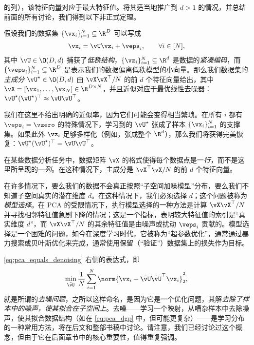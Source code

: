 \documentclass[../../book-main_zh.tex]{subfiles}
\begin{document}
的列），该特征向量对应于最大特征值。将其适当地推广到 \(d > 1\) 的情况，并总结前面的所有讨论，我们得到以下非正式定理。
\begin{theorem}\label{thm:pca}
    假设我们的数据集 \(\{\vx_{i}\}_{i = 1}^{N} \subseteq
    \R^{D}\) 可以写成
    \begin{equation}
        \vx_{i} = \vU\vz_{i} + \veps_{i}, \qquad \forall i \in [N],
    \end{equation}
    其中 \(\vU \in \O(D, d)\) 捕获了\textit{低秩结构}，\(\{\vz_{i}\}_{i =
    1}^{N} \subseteq \R^{d}\) 是数据的\textit{紧凑编码}，而 \(\{\veps_{i}\}_{i
    = 1}^{N} \subseteq \R^{D}\)
    是表示我们的数据偏离低秩模型的小向量。那么我们数据集的\textit{主成分} \(\vU^{\star} \in \O(D,
    d)\) 由 \(\vX\vX^{\top}/N\) 的前 \(d\) 个特征向量给出，其中 \(\vX = [\vx_{1},
        \dots, \vx_{N}] \in \R^{D \times
    N}\)，并且近似对应于最优线性去噪器：\(\vU^{\star}(\vU^{\star})^{\top} \approx
    \vU\vU^{\top}\)。
\end{theorem}
我们在这里不给出明确的近似率，因为它们可能会变得相当繁琐。在所有 \(i\) 都有 \(\veps_{i} = \vzero\)
的特殊情况下，学习到的 \(\vU^{\star}\) 张成了样本 \(\{\vx_{i}\}_{i
= 1}^{N}\) 的支撑集。如果此外 \(\vz_{i}\) 足够多样化（例如，张成整个
\(\R^{d}\)），那么我们将获得完美恢复：\(\vU^{\star}(\vU^{\star})^{\top} = \vU\vU^{\top}\)。

\begin{remark}
    在某些数据分析任务中，数据矩阵 \(\vX\)
    的格式使得每个数据点是一\textit{行}，而不是这里所呈现的一\textit{列}。在这种情况下，主成分是
    \(\vX^{\top}\vX/N\) 的前 \(d\) 个特征向量。
\end{remark}

\begin{remark}[通过去噪特征值进行基选择]
    在许多情况下，要么我们的数据不会真正按照“子空间加噪模型”分布，要么我们不知道子空间真实的潜在维度
    \(d\)。在这种情况下，我们必须选择 \(d\)；这个问题被称为\textit{模型选择}。在 PCA
    的受限情况下，执行模型选择的一种方法是计算 \(\vX\vX^{\top}/N\)
    并寻找相邻特征值急剧下降的情况；这是一个指标，表明较大特征值的索引是“真实维度 \(d\)”，而
    \(\vX\vX^{\top}/N\) 的其余特征值是由噪声或扰动 \(\veps_{i}\)
    贡献的。模型选择是一个困难的问题，如今在深度学习时代，它被称为“超参数优化”，通常通过暴力搜索或贝叶斯优化来完成，通常使用保留（“验证”）数据集上的损失作为目标。
\end{remark}

\begin{remark}[去噪样本]
    \eqref{eq:pca_equals_denoising} 右侧的表达式，即
    \begin{equation}\label{eq:orthogonal_denoising}
        \min_{\tilde{\vU}}\frac{1}{N}\sum_{i = 1}^{N}\norm{\vx_{i} -
        \tilde{\vU}\tilde{\vU}^{\top}\vx_{i}}_{2}^{2},
    \end{equation}
    就是所谓的\textit{去噪问题}，之所以这样命名，是因为它是一个优化问题，其解\textit{去除了样本中的噪声，使其拟合在子空间上}。去噪——学习一个映射，从嘈杂样本中去除噪声，使其拟合数据结构（如在
    \eqref{eq:pca_dgp}
    中，但可能更复杂）——是学习分布的一种常用方法，将在后文和整部书稿中讨论。请注意，我们已经讨论过这个概念，但由于它在后面章节中的核心重要性，值得重复强调。
\end{remark}
\end{document}
